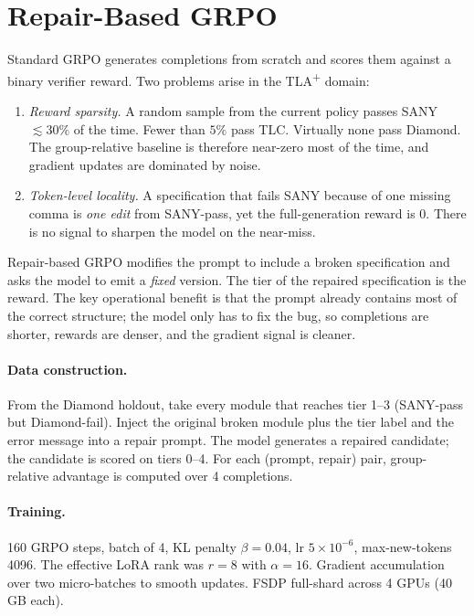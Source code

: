 \documentclass[11pt]{article}
\begin{document}
\section{Repair-Based GRPO}
\label{sec:repair-grpo}

Standard GRPO generates completions from scratch and scores them
against a binary verifier reward.  Two problems arise in the
TLA\textsuperscript{+} domain:

\begin{enumerate}[leftmargin=1.6em, itemsep=1pt]
\item \emph{Reward sparsity.}  A random sample from the current
  policy passes SANY $\lesssim 30\%$ of the time.  Fewer than $5\%$
  pass TLC.  Virtually none pass Diamond.  The group-relative baseline
  is therefore near-zero most of the time, and gradient updates are
  dominated by noise.
\item \emph{Token-level locality.}  A specification that fails
  SANY because of one missing comma is \emph{one edit} from SANY-pass,
  yet the full-generation reward is $0$.  There is no signal to sharpen
  the model on the near-miss.
\end{enumerate}

Repair-based GRPO modifies the prompt to include a broken
specification and asks the model to emit a \emph{fixed} version.  The
tier of the repaired specification is the reward.  The key operational
benefit is that the prompt already contains most of the correct
structure; the model only has to fix the bug, so
completions are shorter, rewards are denser, and the gradient signal
is cleaner.

\paragraph{Data construction.}  From the Diamond holdout, take every
module that reaches tier 1--3 (SANY-pass but Diamond-fail).  Inject
the original broken module plus the tier label and the error message
into a repair prompt.  The model generates a repaired candidate; the
candidate is scored on tiers 0--4.  For each (prompt, repair) pair,
group-relative advantage is computed over 4 completions.

\paragraph{Training.}  160 GRPO steps, batch of 4, KL penalty
$\beta\!=\!0.04$, lr $5\!\times\!10^{-6}$, max-new-tokens 4096.
The effective LoRA rank was $r\!=\!8$ with $\alpha\!=\!16$.
Gradient accumulation over two micro-batches to smooth updates.
FSDP full-shard across 4 GPUs (40\,GB each).
\end{document}
